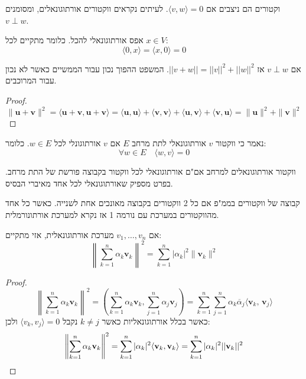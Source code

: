 \documentclass{tstextbook}
\begin{document}
\begin{definition}
וקטורים הם ניצבים אם \(\langle v, w \rangle = 0\). לעיתים נקראים ווקטורים אורתוגונאלים, ומסומנים \(v\perp w\).

\end{definition}
\begin{proposition}
אפס אורתוגונאלי להכל. כלומר מתקיים לכל \(x \in V\):
$$\langle 0,x \rangle =\langle x,0 \rangle =0$$

\end{proposition}
\begin{theorem}[פתגורס]
אם \(v\perp w\) אז \(||v+w|| = ||v||^2 + ||w||^2\). המשפט ההפוך נכון עבור הממשיים כאשר לא נכון עבור המרוכבים.

\end{theorem}
\begin{proof}
$$\|\mathbf{u}+\mathbf{v}\|^{2}=\langle\mathbf{u}+\mathbf{v},\mathbf{u}+\mathbf{v}\rangle=\langle\mathbf{u},\mathbf{u}\rangle+\langle\mathbf{v},\mathbf{v}\rangle+\langle\mathbf{u},\mathbf{v}\rangle+\langle\mathbf{v},\mathbf{u}\rangle=\|\mathbf{u}\|^{2}+\|\mathbf{v}\|^{2}$$

\end{proof}
\begin{definition}
נאמר כי ווקטור \(v\) אורתוגונאלי לתת מרחב \(E\) אם \(v\) אורתוגונלי לכל \(w \in E\). כלומר:
$$\forall w \in E\quad \langle w,v \rangle =0$$

\end{definition}
\begin{proposition}
ווקטור אורתוגונאלים למרחב אם"ם אורתוגונאלי לכל ווקטור בקבוצה פורשת של התת מרחב. בפרט מספיק שאורתוגונאלי לכל אחד מאיברי הבסיס.

\end{proposition}
\begin{definition}
קבוצה של ווקטורים בממ"פ אם כל 2 ווקטורים בקבוצה מאונכים אחת לשנייה. כאשר כל אחד מהווקטורים במערכת עם נורמה 1 אז נקרא למערכת אורתונורמלית.

\end{definition}
\begin{theorem}
אם \(v_{1},\dots,v_{n}\) מערכת אורתוגונאלית, אזי מתקיים:
$$\left\|\sum_{k=1}^{n}\alpha_{k}\mathbf{v}_{k}\right\|^{2}=\sum_{k=1}^{n}|\alpha_{k}|^{2}\|\mathbf{v}_{k}\|^{2}$$

\end{theorem}
\begin{proof}
$$\left\|\sum_{k=1}^{n}\alpha_{k}\mathbf{v}_{k}\right\|^{2}=\left(\sum_{k=1}^{n}\alpha_{k}\mathbf{v}_{k},\sum_{j=1}^{n}\alpha_{j}\mathbf{v}_{j}\right)=\sum_{k=1}^{n}\sum_{j=1}^{n}\alpha_{k}{\overline{{\alpha}}}_{j}\langle\mathbf{v}_{k},\,\mathbf{v}_{j}\rangle$$
כאשר בכלל אורתוגונאליות כאשר \(k\neq j\) נקבל \(\langle v_{k},v_{j} \rangle=0\) ולכן:
$$\left\|\sum_{k=1}^{n}\alpha_{k}\mathbf{v}_{k}\right\|^{2} = \sum_{k=1}^{n}|\alpha_{k}|^{2}\langle{\bf v}_{k},{\bf v}_{k}\rangle=\sum_{k=1}^{n}|\alpha_{k}|^{2}||{\bf v}_{k}||^{2}$$

\end{proof}
\end{document}

